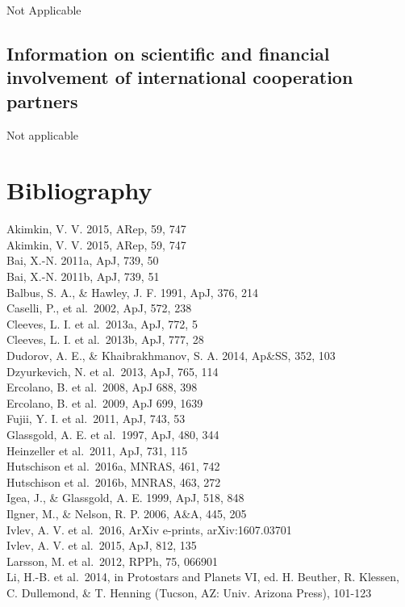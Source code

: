 \documentclass[10pt,fleqn,twoside]{article}
\begin{document}
Not Applicable 

\subsection{Information on scientific and financial involvement of international cooperation partners}

Not applicable 

\section{Bibliography}

\noindent
Akimkin, V. V. 2015, ARep, 59, 747 \\
Akimkin, V. V. 2015, ARep, 59, 747 \\
Bai, X.-N. 2011a, ApJ, 739, 50 \\
Bai, X.-N. 2011b, ApJ, 739, 51 \\
Balbus, S. A., \& Hawley, J. F. 1991, ApJ, 376, 214 \\
Caselli, P., et al.\ 2002, ApJ, 572, 238 \\
Cleeves, L. I. et al.\ 2013a, ApJ, 772, 5 \\
Cleeves, L. I. et al.\ 2013b, ApJ, 777, 28 \\
Dudorov, A. E., \& Khaibrakhmanov, S. A. 2014, Ap\&SS, 352, 103 \\
Dzyurkevich, N. et al.\ 2013, ApJ, 765, 114 \\
Ercolano, B. et al.\ 2008, ApJ 688, 398 \\
Ercolano, B. et al.\ 2009, ApJ 699, 1639\\
Fujii, Y. I. et al.\ 2011, ApJ, 743, 53 \\
Glassgold, A. E. et al.\ 1997, ApJ, 480, 344 \\
Heinzeller et al.\ 2011, ApJ, 731, 115 \\
Hutschison et al.\ 2016a, MNRAS, 461, 742\\
Hutschison et al.\ 2016b, MNRAS, 463, 272\\ 
Igea, J., \& Glassgold, A. E. 1999, ApJ, 518, 848 \\
Ilgner, M., \& Nelson, R. P. 2006, A\&A, 445, 205 \\
Ivlev, A. V. et al.\ 2016, ArXiv e-prints, arXiv:1607.03701\\ 
Ivlev, A. V. et al.\  2015, ApJ, 812, 135 \\
Larsson, M. et al.\ 2012, RPPh, 75, 066901\\  
Li, H.-B. et al.\ 2014, in Protostars and Planets VI, ed. H. Beuther, R. Klessen, C. Dullemond, \& T. Henning (Tucson, AZ: Univ. Arizona Press), 101-123 \\
\end{document}
